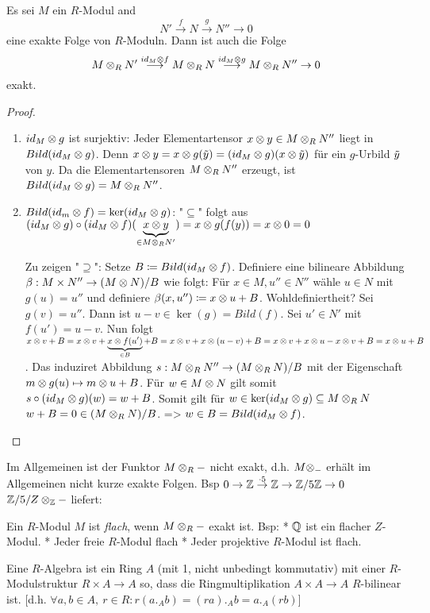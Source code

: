 \documentclass[../main.tex]{subfiles}
\begin{document}
\begin{theorem}
    Es sei $M$ ein $R$-Modul and $$N'\overset{f}{\longrightarrow} N \overset{g}{\longrightarrow} N'' \rightarrow 0$$ eine exakte Folge von $R$-Moduln.
    Dann ist auch die Folge $$M\otimes_R N'\overset{id_M\otimes f}{\longrightarrow} M\otimes_R N \overset{id_M\otimes g}{\longrightarrow} M\otimes_R N'' \rightarrow 0$$ exakt.
\end{theorem}
\begin{proof}
    \begin{enumerate}
        \item $id_M\otimes g$ ist surjektiv:
        Jeder Elementartensor $x\otimes y\in M\otimes_R N''$ liegt in $Bild(id_M\otimes g)$. Denn $x\otimes y = x\otimes g(\Tilde{y}) = (id_M\otimes g) (x\otimes \Tilde{y})$ für ein $g$-Urbild $\Tilde{y}$ von $y$.
        Da die Elementartensoren $M\otimes_R N''$ erzeugt, ist $Bild(id_M \otimes g) = M\otimes_R N''$.
        \item $Bild(id_m\otimes f) =\ker(id_M \otimes g)$:
        "$\subseteq$" folgt aus $(id_M\otimes g)\circ (id_M\otimes f) (\underbrace{x\otimes y}_{\in M\otimes_R N'}) = x\otimes g(f(y)) = x\otimes 0 = 0$
        
        Zu zeigen "$\supseteq$":
        Setze $B\coloneqq Bild(id_M\otimes f)$.
        Definiere eine bilineare Abbildung $\beta: M\times N'' \rightarrow (M\otimes N)/B$ wie folgt:
        Für $x\in M, u'' \in N''$ wähle $u\in N$ mit $g(u) = u''$ und definiere $\beta(x,u'')\coloneqq x\otimes u + B$.
        Wohldefiniertheit? Sei $g(v) = u''$. Dann ist $u-v \in \ker(g) = Bild(f)$. Sei $u'\in N'$ mit $f(u') = u-v$. Nun folgt $x\otimes v +B = x\otimes v + \underbrace{x\otimes f(u')}_{\in B} +B = x\otimes v + x\otimes (u-v) +B = x\otimes v + x\otimes u - x\otimes v + B = x\otimes u +B$.
        Das induziret Abbildung $s:M\otimes_R N'' \rightarrow (M\otimes_R N)/B$ mit der Eigenschaft $m\otimes g(u)\mapsto m\otimes u +B$.
        Für $w\in M\otimes N$ gilt somit $s\circ(id_M\otimes g)(w) = w+B$.
        Somit gilt für $w\in \ker(id_M\otimes g)\subseteq M\otimes_R N$ $w+B=0\in (M\otimes_R N)/B$.
        => $w\in B = Bild(id_M\otimes f)$.
    \end{enumerate}
\end{proof}
\begin{remark}
    Im Allgemeinen ist der Funktor $M\otimes_R -$ nicht exakt, d.h. $M\otimes_-$ erhält im Allgemeinen nicht kurze exakte Folgen.
    Bsp $0\rightarrow\mathbb{Z}\overset{\cdot 5}{\rightarrow} \mathbb{Z}\rightarrow\mathbb{Z}/5\mathbb{Z}\rightarrow 0$
    $\mathbb{Z}/5/Z\otimes_{\mathbb{Z}} -$ liefert:
    \TODO[bild]
\end{remark}

Ein $R$-Modul $M$ ist \emph{flach}, wenn $M\otimes_R -$ exakt ist.
Bsp: * $\mathbb{Q}$ ist ein flacher $Z$-Modul.
* Jeder freie $R$-Modul flach
* Jeder projektive $R$-Modul ist flach.

\begin{definition}
    Eine $R$-Algebra ist ein Ring $A$ (mit 1, nicht unbedingt kommutativ) mit einer $R$-Modulstruktur $R\times A \rightarrow A$ so, dass die Ringmultiplikation $A\times A\rightarrow A$ $R$-bilinear ist.
    [d.h. $\forall a,b\in A,\ r\in R: r(a._Ab) = (ra)._A b = a._A(rb)$]
\end{definition}
\end{document}
